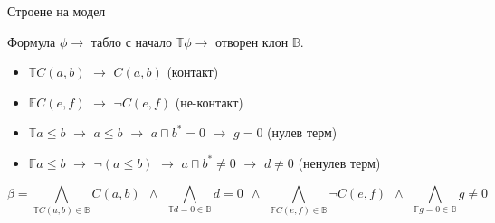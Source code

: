\documentclass[14pt, aspectratio=169]{beamer}
\newcommand\ST{\mathbb{T}}
\newcommand\SF{\mathbb{F}}
\newcommand\SB{\mathbb{B}}
\newcommand\M{\mathcal{M}}
\newcommand\F{\mathcal{F}}
\newcommand{\BranchConjunction}{%
\begin{equation*}
			\beta =
			\bigwedge_{\ST C(a,b)\in{\SB}} C(a, b) \:\: \wedge \:\:
			\bigwedge_{\ST d = 0\in{\SB}} d = 0 \:\: \wedge \:\:
			\bigwedge_{\SF C(e,f)\in{\SB}} \neg C(e, f) \:\: \wedge \:\:
			\bigwedge_{\SF g = 0\in{\SB}} g \neq 0
\end{equation*}%
}
\begin{document}
%
%
%
%
\begin{frame}{Строене на модел}
	\begin{center}
		Формула $\phi \rightarrow$ табло с начало $\ST \phi \rightarrow$ отворен клон $\SB$.
	\end{center}

	\begin{itemize}
		\item $\ST C(a,b)$ $\rightarrow$ $C(a,b)$ (контакт)
		\item $\SF C(e,f)$ $\rightarrow$ $\neg C(e,f)$ (не-контакт)
		\item $\ST a \leq b$ $\rightarrow$ $a \leq b$ $\rightarrow$ $a \sqcap b^*=0$ $\rightarrow$ $g = 0$ (нулев терм)
		\item $\SF a \leq b$ $\rightarrow$ $\neg (a \leq b)$ $\rightarrow$ $a \sqcap b^* \neq 0$ $\rightarrow$ $d \neq 0$ (ненулев терм)
	\end{itemize}

	\BranchConjunction
\end{frame}
\end{document}
